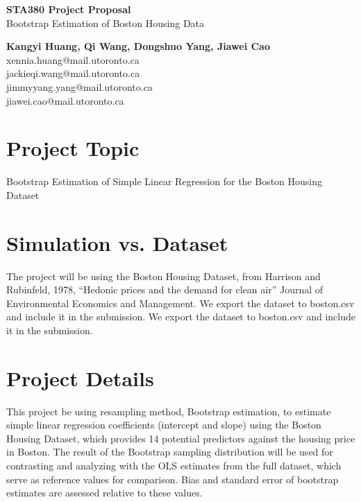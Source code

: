 \documentclass{article}
\begin{document}
	\begin{center}
    
    
		\LARGE{\textbf{STA380 Project Proposal}} \\
        \vspace{1em}
        \Large{Bootstrap Estimation of Boston Housing Data} \\
        \vspace{1em}

        \normalsize\textbf{Kangyi Huang, Qi Wang, Dongshuo Yang, Jiawei Cao} \\
        \normalsize{xennia.huang@mail.utoronto.ca} \\
        \normalsize{jackieqi.wang@mail.utoronto.ca} \\
        \normalsize{jimmyyang.yang@mail.utoronto.ca} \\
        \normalsize{jiawei.cao@mail.utoronto.ca} \\

	\end{center}

    	\section{Project Topic}
         Bootstrap Estimation of Simple Linear Regression for the Boston Housing Dataset

        \section{Simulation vs. Dataset}
        The project will be using the Boston Housing Dataset, from Harrison and Rubinfeld, 1978, 
        ``Hedonic prices and the demand for clean air” Journal of Environmental Economics and Management. 
        We export the dataset to boston.csv and include it in the submission. We export the dataset to 
        boston.csv and include it in the submission.
        
        \section{Project Details}
        This project be using resampling method, Bootstrap estimation, to estimate simple linear regression
        coefficients (intercept and slope) using the Boston Housing Dataset, which provides 14 potential
        predictors against the housing price in Boston. The result of the Bootstrap sampling distribution
        will be used for contrasting and analyzing with the OLS estimates from the full dataset,
        which serve as reference values for comparison. Bias and standard error of bootstrap estimates are
        assessed relative to these values.
        
\end{document}
